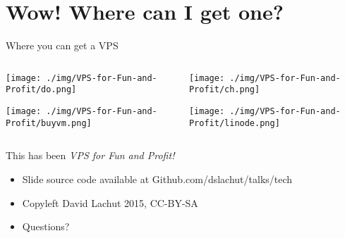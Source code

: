 \documentclass[presentation,aspectratio=169]{beamer}
\begin{document}
\section{Wow! Where can I get one?}
\label{sec-5}
\begin{frame}[label=sec-5-0-1]{Where you can get a VPS}
\begin{columns}
\begin{column}{0.48\textwidth}

\begin{center}
\texttt{[image: ./img/VPS-for-Fun-and-Profit/do.png]}
\end{center}

\begin{center}
\texttt{[image: ./img/VPS-for-Fun-and-Profit/buyvm.png]}
\end{center}
\end{column}

\begin{column}{0.48\textwidth}

\begin{center}
\texttt{[image: ./img/VPS-for-Fun-and-Profit/ch.png]}
\end{center}

\begin{center}
\texttt{[image: ./img/VPS-for-Fun-and-Profit/linode.png]}
\end{center}
\end{column}
\end{columns}
\end{frame}

\begin{frame}[label=sec-5-0-2]{This has been \emph{VPS for Fun and Profit!}}
\begin{itemize}
\item Slide source code available at \alert{Github.com/dslachut/talks/tech}
\item Copyleft David Lachut 2015, CC-BY-SA
\item Questions?
\end{itemize}
\end{frame}
\end{document}
